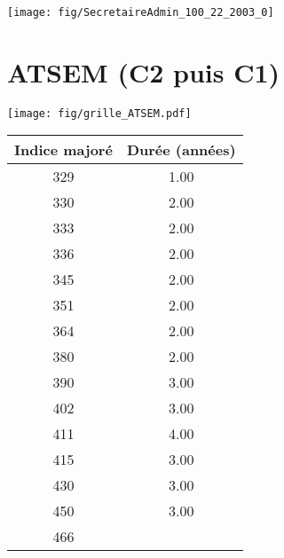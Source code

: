  \vspace{0.1cm} 

 {\hspace{-2.2cm}\texttt{[image: fig/SecretaireAdmin\_100\_22\_2003\_0]}} 

\newpage 
 
\chapter{ATSEM (C2 puis C1)} 

\begin{minipage}{0.55\linewidth}\texttt{[image: fig/grille\_ATSEM.pdf]}\end{minipage} 
\begin{minipage}{0.3\linewidth} 
 \begin{center} 

\begin{tabular}[htb]{|c|c|} 
\hline 
 Indice majoré &  Durée (années) \\ 
\hline \hline 
 329 &  1.00 \\ 
\hline 
 330 &  2.00 \\ 
\hline 
 333 &  2.00 \\ 
\hline 
 336 &  2.00 \\ 
\hline 
 345 &  2.00 \\ 
\hline 
 351 &  2.00 \\ 
\hline 
 364 &  2.00 \\ 
\hline 
 380 &  2.00 \\ 
\hline 
 390 &  3.00 \\ 
\hline 
 402 &  3.00 \\ 
\hline 
 411 &  4.00 \\ 
\hline 
 415 &  3.00 \\ 
\hline 
 430 &  3.00 \\ 
\hline 
 450 &  3.00 \\ 
\hline 
 466 &   \\ 
\hline 
\hline 
\end{tabular} 
\end{center} 
 \end{minipage} 

~\\ 
 


   
 \localtableofcontents 

